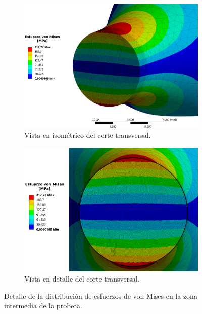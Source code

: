 \begin{figure}[]
	\ContinuedFloat
	\centering
	\begin{subfigure}{0.9\linewidth}
		\centering
		\includegraphics[width=\linewidth]{Imagenes/esfvm_corteiso.pdf}
		\caption{Vista en isométrico del corte transversal.}
		\label{fig:corte_iso201}
	\end{subfigure}		
	\begin{subfigure}{0.9\linewidth}
		\centering
		\includegraphics[width=\linewidth]{Imagenes/esfvm_corte.pdf}
		\caption{Vista en detalle del corte transversal.}
		\label{fig:corte201}
	\end{subfigure}
\caption{Detalle de la distribución de esfuerzos de von Mises en la zona intermedia de la probeta.}
\label{fig:resultados_vm}
\end{figure}

